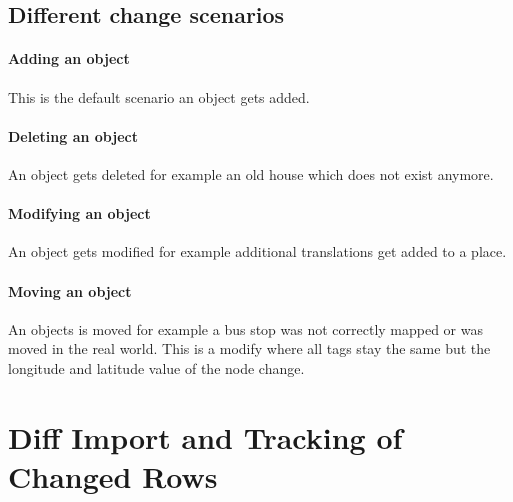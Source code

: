 \subsection{Different change scenarios}

\paragraph{Adding an object} This is the default scenario an object gets added.

\paragraph{Deleting an object} An object gets deleted for example an old house which does not exist anymore.

\paragraph{Modifying an object} An object gets modified for example additional translations get added to a place.

\paragraph{Moving an object} An objects is moved for example a bus stop was not correctly mapped or was moved in the real world. This is a modify where all tags stay the same but the longitude and latitude value of the node change.

\section{Diff Import and Tracking of Changed Rows}

